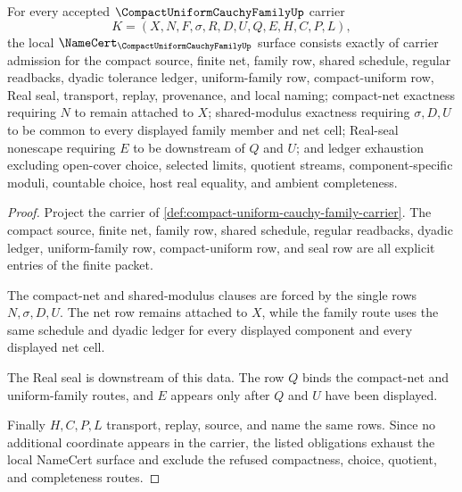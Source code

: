 \begin{theorem}
\label{thm:compact-uniform-cauchy-family-namecert-obligations}
For every accepted $\CompactUniformCauchyFamilyUp$ carrier
$$
K=(X,N,F,\sigma,R,D,U,Q,E,H,C,P,L),
$$
the local $\NameCert_{\CompactUniformCauchyFamilyUp}$ surface consists exactly of carrier admission for the compact source, finite net, family row, shared schedule, regular readbacks, dyadic tolerance ledger, uniform-family row, compact-uniform row, Real seal, transport, replay, provenance, and local naming; compact-net exactness requiring $N$ to remain attached to $X$; shared-modulus exactness requiring $\sigma,D,U$ to be common to every displayed family member and net cell; Real-seal nonescape requiring $E$ to be downstream of $Q$ and $U$; and ledger exhaustion excluding open-cover choice, selected limits, quotient streams, component-specific moduli, countable choice, host real equality, and ambient completeness.
\end{theorem}
\begin{proof}
Project the carrier of \autoref{def:compact-uniform-cauchy-family-carrier}. The compact source, finite net, family row, shared schedule, regular readbacks, dyadic ledger, uniform-family row, compact-uniform row, and seal row are all explicit entries of the finite packet.

The compact-net and shared-modulus clauses are forced by the single rows $N,\sigma,D,U$. The net row remains attached to $X$, while the family route uses the same schedule and dyadic ledger for every displayed component and every displayed net cell.

The Real seal is downstream of this data. The row $Q$ binds the compact-net and uniform-family routes, and $E$ appears only after $Q$ and $U$ have been displayed.

Finally $H,C,P,L$ transport, replay, source, and name the same rows. Since no additional coordinate appears in the carrier, the listed obligations exhaust the local NameCert surface and exclude the refused compactness, choice, quotient, and completeness routes.
\end{proof}

